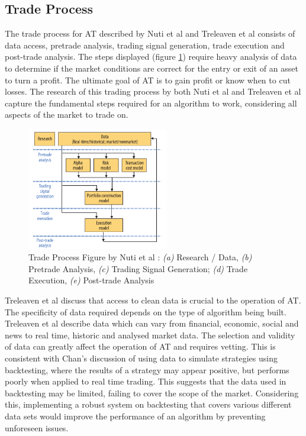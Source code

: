 \subsection{Trade Process}
\label{sec:related:algoTrading:tradeprocess}
The trade process for AT described by Nuti et al \cite{ART:Nuti:2011} and Treleaven et al  \cite{ART:Treleaven:2013} consists of data access, pretrade analysis, trading signal generation, trade execution and post-trade analysis. The steps displayed (figure \ref{fig:related:tradeprocess}) require heavy analysis of data to determine if the market conditions are correct for the entry or exit of an asset to turn a profit. The ultimate goal of AT is to gain profit or know when to cut losses. The research of this trading process by both Nuti et al \cite{ART:Nuti:2011} and Treleaven et al \cite{ART:Treleaven:2013} capture the fundamental steps required for an algorithm to work, considering all aspects of the market to trade on.

\begin{figure}[htb]
    \centering
	\includegraphics[width=0.55\textwidth]{content/graphics/AT-trade_process}
	\caption{Trade Process Figure by Nuti et al \cite{ART:Nuti:2011}: \textit{(a)} Research / Data, \textit{(b)} Pretrade Analysis, \textit{(c)} Trading Signal Generation; \textit{(d)} Trade Execution, \textit{(e)} Post-trade Analysis }
	\label{fig:related:tradeprocess}
\end{figure}

Treleaven et al \cite{ART:Treleaven:2013} discuss that access to clean data is crucial to the operation of AT. The specificity of data required depends on the type of algorithm being built. Treleaven et al describe data which can vary from financial, economic, social and news to real time, historic and analysed market data. The selection and validity of data can greatly affect the operation of AT and requires vetting. This is consistent with Chan's \cite{BOOK:Chan:2013}  discussion of using data to simulate strategies using backtesting, where the results of a strategy may appear positive, but performs poorly when applied to real time trading. This suggests that the data used in backtesting may be limited, failing to cover the scope of the market. Considering this, implementing a robust system on backtesting that covers various different data sets would improve the performance of an algorithm by preventing unforeseen issues.

